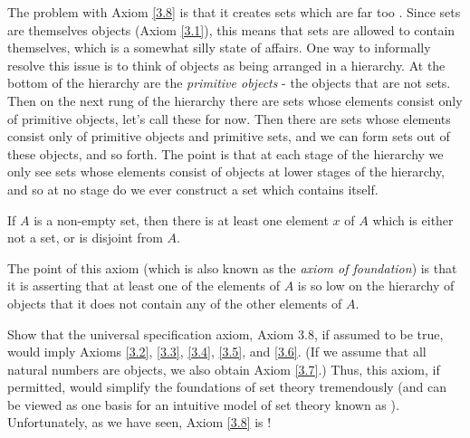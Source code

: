 \begin{note}
The problem with Axiom \ref{3.8} is that it creates sets which are far too .
Since sets are themselves objects (Axiom \ref{3.1}), this means that sets are allowed to contain themselves, which is a somewhat silly state of affairs.
One way to informally resolve this issue is to think of objects as being arranged in a hierarchy.
At the bottom of the hierarchy are the \emph{primitive objects} - the objects that are not sets.
Then on the next rung of the hierarchy there are sets whose elements consist only of primitive objects, let’s call these  for now.
Then there are sets whose elements consist only of primitive objects and primitive sets, and we can form sets out of these objects, and so forth.
The point is that at each stage of the hierarchy we only see sets whose elements consist of objects at lower stages of the hierarchy, and so at no stage do we ever construct a set which contains itself.
\end{note}

\begin{axiom}[Regularity]\label{3.9}
If \(A\) is a non-empty set, then there is at least one element \(x\) of \(A\) which is either not a set, or is disjoint from \(A\).
\end{axiom}

\begin{note}
The point of this axiom (which is also known as the \emph{axiom of foundation}) is that it is asserting that at least one of the elements of \(A\) is so low on the hierarchy of objects that it does not contain any of the other elements of \(A\).
\end{note}

\exercisesection

\begin{exercise}\label{ex 3.2.1}
Show that the universal specification axiom, Axiom 3.8, if assumed to be true, would imply Axioms \ref{3.2}, \ref{3.3}, \ref{3.4}, \ref{3.5}, and \ref{3.6}.
(If we assume that all natural numbers are objects, we also obtain Axiom \ref{3.7}.)
Thus, this axiom, if permitted, would simplify the foundations of set theory tremendously (and can be viewed as one basis for an intuitive model of set theory known as ).
Unfortunately, as we have seen, Axiom \ref{3.8} is !
\end{exercise}

